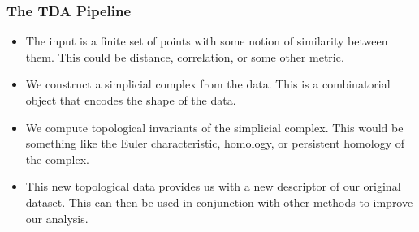 \documentclass{beamer}
\begin{document}
\begin{frame}%
\frametitle{The TDA Pipeline}

\begin{itemize}

\item The input is a finite set of points with some notion of similarity between them. This could be
  distance, correlation, or some other metric.
\pause

\item We construct a simplicial complex from the data. This is a combinatorial object that encodes
  the shape of the data.
\pause

\item We compute topological invariants of the simplicial complex. This would be something like the
  Euler characteristic, homology, or persistent homology of the complex.

\pause

\item This new topological data provides us with a new descriptor of our original dataset. This can then be used in
  conjunction with other methods to improve our analysis.


\end{itemize}

\end{frame}%
\end{document}
